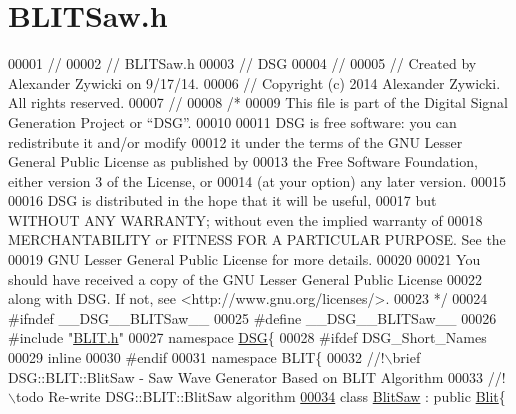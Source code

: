 \hypertarget{_b_l_i_t_saw_8h_source}{\section{B\+L\+I\+T\+Saw.\+h}
\label{_b_l_i_t_saw_8h_source}
}

\begin{DoxyCode}
00001 \textcolor{comment}{//}
00002 \textcolor{comment}{//  BLITSaw.h}
00003 \textcolor{comment}{//  DSG}
00004 \textcolor{comment}{//}
00005 \textcolor{comment}{//  Created by Alexander Zywicki on 9/17/14.}
00006 \textcolor{comment}{//  Copyright (c) 2014 Alexander Zywicki. All rights reserved.}
00007 \textcolor{comment}{//}
00008 \textcolor{comment}{/*}
00009 \textcolor{comment}{ This file is part of the Digital Signal Generation Project or “DSG”.}
00010 \textcolor{comment}{}
00011 \textcolor{comment}{ DSG is free software: you can redistribute it and/or modify}
00012 \textcolor{comment}{ it under the terms of the GNU Lesser General Public License as published by}
00013 \textcolor{comment}{ the Free Software Foundation, either version 3 of the License, or}
00014 \textcolor{comment}{ (at your option) any later version.}
00015 \textcolor{comment}{}
00016 \textcolor{comment}{ DSG is distributed in the hope that it will be useful,}
00017 \textcolor{comment}{ but WITHOUT ANY WARRANTY; without even the implied warranty of}
00018 \textcolor{comment}{ MERCHANTABILITY or FITNESS FOR A PARTICULAR PURPOSE.  See the}
00019 \textcolor{comment}{ GNU Lesser General Public License for more details.}
00020 \textcolor{comment}{}
00021 \textcolor{comment}{ You should have received a copy of the GNU Lesser General Public License}
00022 \textcolor{comment}{ along with DSG.  If not, see <http://www.gnu.org/licenses/>.}
00023 \textcolor{comment}{ */}
00024 \textcolor{preprocessor}{#ifndef \_\_DSG\_\_BLITSaw\_\_}
00025 \textcolor{preprocessor}{#define \_\_DSG\_\_BLITSaw\_\_}
00026 \textcolor{preprocessor}{#include "\hyperlink{_b_l_i_t_8h}{BLIT.h}"}
00027 \textcolor{keyword}{namespace }\hyperlink{namespace_d_s_g}{DSG}\{
00028 \textcolor{preprocessor}{#ifdef DSG\_Short\_Names}
00029     \textcolor{keyword}{inline}
00030 \textcolor{preprocessor}{#endif}
00031     \textcolor{keyword}{namespace }BLIT\{\textcolor{comment}{}
00032 \textcolor{comment}{        //!\(\backslash\)brief DSG::BLIT::BlitSaw - Saw Wave Generator Based on BLIT Algorithm}
00033 \textcolor{comment}{        //!\(\backslash\)todo Re-write DSG::BLIT::BlitSaw algorithm}
\hypertarget{_b_l_i_t_saw_8h_source_l00034}{}\hyperlink{class_d_s_g_1_1_b_l_i_t_1_1_blit_saw}{00034} \textcolor{comment}{}        \textcolor{keyword}{class }\hyperlink{class_d_s_g_1_1_b_l_i_t_1_1_blit_saw}{BlitSaw} : \textcolor{keyword}{public} \hyperlink{class_d_s_g_1_1_b_l_i_t_1_1_blit}{Blit}\{

\end{DoxyCode}
